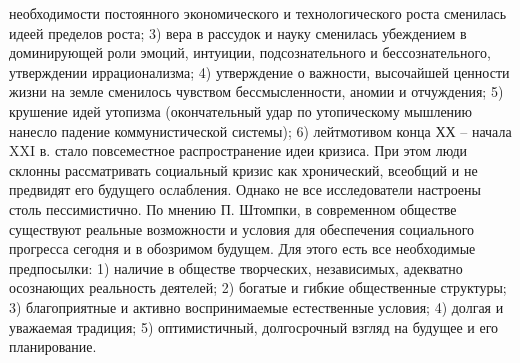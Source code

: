 \documentclass[12pt]{article}
\begin{document}
необходимости постоянного экономического и технологического роста сменилась идеей пределов роста; 3) вера
в  рассудок  и  науку  сменилась  убеждением  в  доминирующей  роли  эмоций,  интуиции,  подсознательного  и
бессознательного, утверждении иррационализма; 4) утверждение о важности, высочайшей ценности жизни на
земле  сменилось  чувством  бессмысленности,  аномии  и  отчуждения;  5)  крушение  идей  утопизма
(окончательный  удар  по  утопическому  мышлению  нанесло  падение  коммунистической  системы);  6)
лейтмотивом конца ХХ – начала XXI в. стало повсеместное распространение идеи кризиса. При этом люди
склонны  рассматривать  социальный  кризис  как  хронический,  всеобщий  и  не  предвидят  его  будущего
ослабления.
Однако  не  все  исследователи  настроены  столь  пессимистично.  По  мнению  П.  Штомпки,  в  современном
обществе существуют реальные возможности и условия для обеспечения социального прогресса сегодня и в
обозримом  будущем.  Для  этого  есть  все  необходимые  предпосылки:  1)  наличие  в  обществе  творческих,
независимых, адекватно осознающих реальность деятелей; 2) богатые и гибкие общественные структуры; 3) 
благоприятные  и  активно  воспринимаемые  естественные  условия;  4)  долгая  и  уважаемая  традиция;  5)
оптимистичный, долгосрочный взгляд на будущее и его планирование. 

\newpage
\end{document}
